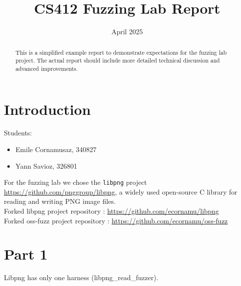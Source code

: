 \documentclass[11pt]{article}
\title{\textbf{CS412 Fuzzing Lab Report}}
\date{April 2025}
\begin{document}
    \maketitle

    \begin{abstract}
        This is a simplified example report to demonstrate expectations for the fuzzing lab project. The actual report should include more detailed technical discussion and advanced improvements.
    \end{abstract}

    \section{Introduction}
    Students:
    \begin{itemize}
        \item Emile Cornamusaz, 340827
        \item Yann Savioz, 326801
    \end{itemize}
    For the fuzzing lab we chose the \texttt{libpng} project \url{https://github.com/pnggroup/libpng}, a widely used open-source C library for reading and writing PNG image files. \\
    Forked libpng project repository : \url{https://github.com/ecornamu/libpng} \\
    Forked oss-fuzz project repository : \url{https://github.com/ecornamu/oss-fuzz}

    \section{Part 1}
    Libpng has only one harness (libpng\_read\_fuzzer).
\end{document}
